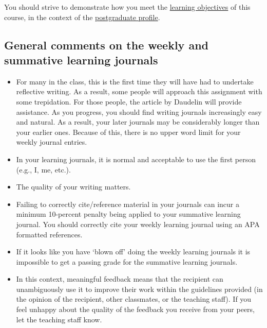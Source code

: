 \documentclass[]{book}
\providecommand{\tightlist}{%
  \setlength{\itemsep}{0pt}\setlength{\parskip}{0pt}}
\theoremstyle{definition}
\theoremstyle{definition}
\theoremstyle{definition}
\theoremstyle{remark}
\begin{document}
You should strive to demonstrate how you meet the
\protect\hyperlink{learning-objectives}{learning objectives} of this
course, in the context of the \protect\hyperlink{profile}{postgraduate
profile}.

\hypertarget{general-comments-on-the-weekly-and-summative-learning-journals}{%
\subsection*{General comments on the weekly and summative learning
journals}\label{general-comments-on-the-weekly-and-summative-learning-journals}}

\begin{itemize}
\tightlist
\item
  For many in the class, this is the first time they will have had to
  undertake reflective writing. As a result, some people will approach
  this assignment with some trepidation. For those people, the article
  by Daudelin \autocite*{daudelin_1996_learningexperiencereflection}
  will provide assistance. As you progress, you should find writing
  journals increasingly easy and natural. As a result, your later
  journals may be considerably longer than your earlier ones. Because of
  this, there is no upper word limit for your weekly journal entries.
\item
  In your learning journals, it is normal and acceptable to use the
  first person (e.g., I, me, etc.).
\item
  The quality of your writing matters.
\item
  Failing to correctly cite/reference material in your journals can
  incur a minimum 10-percent penalty being applied to your summative
  learning journal. You should correctly cite your weekly learning
  journal using an APA formatted references.
\item
  If it looks like you have `blown off' doing the weekly learning
  journals it is impossible to get a passing grade for the summative
  learning journals.
\item
  In this context, meaningful feedback means that the recipient can
  unambiguously use it to improve their work within the guidelines
  provided (in the opinion of the recipient, other classmates, or the
  teaching staff). If you feel unhappy about the quality of the feedback
  you receive from your peers, let the teaching staff know.
\end{itemize}
\end{document}
